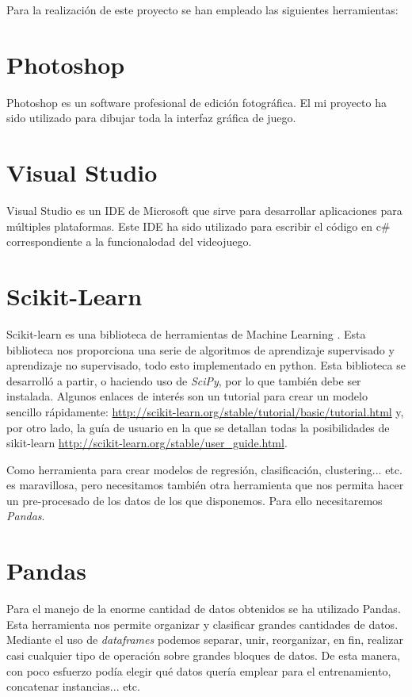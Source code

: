 
Para la realización de este proyecto se han empleado las siguientes herramientas:

\section{Photoshop}
Photoshop es un software profesional de edición fotográfica. El mi proyecto ha sido utilizado para dibujar toda la interfaz gráfica de juego.

\section{Visual Studio}
Visual Studio  es un IDE de Microsoft que sirve para desarrollar aplicaciones para múltiples plataformas. Este IDE ha sido utilizado para escribir el código en c\# correspondiente a la funcionalodad del videojuego.

\section{Scikit-Learn}
 Scikit-learn es una biblioteca de herramientas de Machine Learning \cite{scikit}. Esta biblioteca nos proporciona una serie de algoritmos de aprendizaje supervisado y aprendizaje no supervisado, todo esto implementado en python. Esta biblioteca se desarrolló a partir, o haciendo uso de \emph{SciPy}, por lo que también debe ser instalada. Algunos enlaces de interés son un tutorial para crear un modelo sencillo rápidamente: \url{http://scikit-learn.org/stable/tutorial/basic/tutorial.html} y, por otro lado, la guía de usuario en la que se detallan todas la posibilidades de sikit-learn \url{http://scikit-learn.org/stable/user_guide.html}.

Como herramienta para crear modelos de regresión, clasificación, clustering... etc. es maravillosa, pero necesitamos también otra herramienta que nos permita hacer un pre-procesado de los datos de los que disponemos. Para ello necesitaremos \emph{Pandas}.

\section{Pandas}
Para el manejo de la enorme cantidad de datos obtenidos se ha utilizado Pandas. Esta herramienta nos permite organizar y clasificar grandes cantidades de datos\cite{mckinney-proc-scipy-2010, mckinney-proc-scipy-2011}. Mediante el uso de \emph{dataframes} podemos separar, unir, reorganizar, en fin, realizar casi cualquier tipo de operación sobre grandes bloques de datos. De esta manera, con poco esfuerzo podía elegir qué datos quería emplear para el entrenamiento, concatenar instancias... etc.

